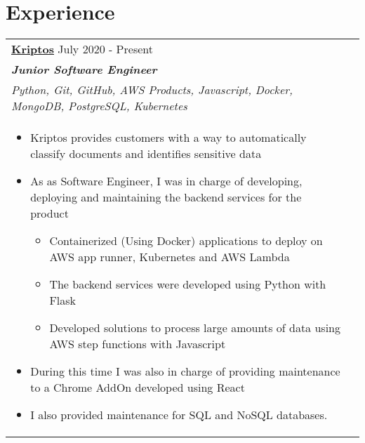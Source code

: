 \documentclass[a4paper,8pt]{article}
\begin{document}
\section{Experience}
\begin{tabularx}{\linewidth}{ @{}l r@{} }
\textbf{\uline{\href{https://www.kriptos.io/en/home}{Kriptos}}} \hfill \color[HTML]{371e77} July 2020 - Present \\[4pt]
\color[HTML]{371e77}\textbf{\textit{Junior Software Engineer}}\ \hfill \color[HTML]{4B28A4} \\ \textit{Python, Git, GitHub, AWS Products, Javascript, Docker, MongoDB, PostgreSQL, Kubernetes} \\[5pt]
\begin{minipage}[t]{\linewidth}
    \begin{itemize}[nosep,after=\strut, leftmargin=2em, itemsep=2pt]
        \item Kriptos provides customers with a way to automatically classify documents and identifies sensitive data
        \item As as Software Engineer, I was in charge of developing, deploying and maintaining the backend services for the product
        \begin{itemize}[nosep,after=\strut, leftmargin=2em, itemsep=2pt]
            \item Containerized (Using Docker) applications to deploy on AWS app runner, Kubernetes and AWS Lambda
            \item The backend services were developed using Python with Flask
            \item Developed solutions to process large amounts of data using AWS step functions with Javascript
        \end{itemize}
        \item During this time I was also in charge of providing maintenance to a Chrome AddOn developed using React
        \item I also provided maintenance for SQL and NoSQL databases.
    \end{itemize}
\end{minipage}
\end{tabularx}
\end{document}
